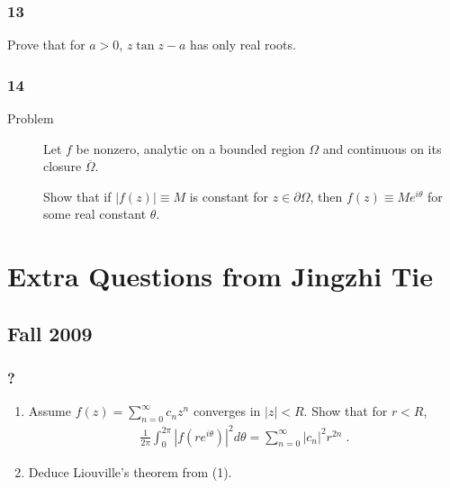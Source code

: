 \hypertarget{section-80}{%
\subsubsection{13}\label{section-80}}

\begin{description}
\tightlist
\item[Problem]
Prove that for \(a> 0\), \(z\tan z - a\) has only real roots.
\end{description}

\hypertarget{section-81}{%
\subsubsection{14}\label{section-81}}

\begin{description}
\item[Problem]
Let \(f\) be nonzero, analytic on a bounded region \(\Omega\) and
continuous on its closure \(\overline \Omega\).

Show that if \({\left\lvert {f(z)} \right\rvert} \equiv M\) is constant
for \(z\in \partial \Omega\), then \(f(z) \equiv Me^{i\theta}\) for some
real constant \(\theta\).
\end{description}

\hypertarget{extra-questions-from-jingzhi-tie}{%
\section{Extra Questions from Jingzhi
Tie}\label{extra-questions-from-jingzhi-tie}}

\hypertarget{fall-2009}{%
\subsection{Fall 2009}\label{fall-2009}}

\hypertarget{section-82}{%
\subsubsection{?}\label{section-82}}

\begin{enumerate}
\def\labelenumi{(\arabic{enumi})}
\item
  Assume \(\displaystyle f(z) = \sum_{n=0}^\infty c_n z^n\) converges in
  \(|z| < R\). Show that for \(r <R\),
  \begin{align*}\frac{1}{2 \pi} \int_0^{2 \pi} |f(r e^{i \theta})|^2 d \theta =
  \sum_{n=0}^\infty |c_n|^2 r^{2n} \; .\end{align*}
\item
  Deduce Liouville's theorem from (1).
\end{enumerate}


